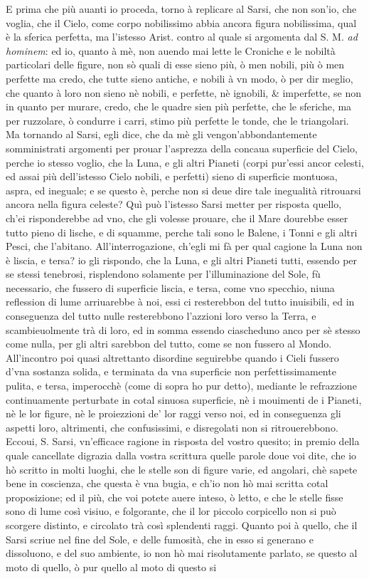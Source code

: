 \documentclass[11pt,twoside,openany]{book}
\begin{document}
E prima che più auanti io proceda, torno à replicare al Sarsi, che non son'io, che voglia, che il Cielo, come corpo nobilissimo abbia ancora figura nobilissima, qual è la sferica perfetta, ma l'istesso Arist. contro al quale si argomenta dal S. M. \textit{ad hominem}: ed io, quanto à mè, non auendo mai lette le Croniche e le nobiltà particolari delle figure, non sò quali di esse sieno più, ò men nobili, più ò men perfette ma credo, che tutte sieno antiche, e nobili à vn modo, ò per dir meglio, che quanto à loro non sieno nè nobili, e perfette, nè ignobili, \& imperfette, se non in quanto per murare, credo, che le quadre sien più perfette, che le sferiche, ma per ruzzolare, ò condurre i carri, stimo più perfette le tonde, che le triangolari. Ma tornando al Sarsi, egli dice, che da mè gli vengon'abbondantemente somministrati argomenti per prouar l'asprezza della concaua superficie del Cielo, perche io stesso voglio, che la Luna, e gli altri Pianeti (corpi pur'essi ancor celesti, ed assai più dell'istesso Cielo nobili, e perfetti) sieno di superficie montuosa, aspra, ed ineguale; e se questo è, perche non si deue dire tale inegualità ritrouarsi ancora nella figura celeste? Quì può l'istesso Sarsi metter per risposta quello, ch'ei risponderebbe ad vno, che gli volesse prouare, che il Mare dourebbe esser tutto pieno di lische, e di squamme, perche tali sono le Balene, i Tonni e gli altri Pesci, che l'abitano. All'interrogazione, ch'egli mi fà per qual cagione la Luna non è liscia, e tersa? io gli rispondo, che la Luna, e gli altri Pianeti tutti, essendo per se stessi tenebrosi, risplendono solamente per l'illuminazione del Sole, fù necessario, che fussero di superficie liscia, e tersa, come vno specchio, niuna reflession di lume arriuarebbe à noi, essi ci resterebbon del tutto inuisibili, ed in conseguenza del tutto nulle resterebbono l'azzioni loro verso la Terra, e scambieuolmente trà di loro, ed in somma essendo ciascheduno anco per sè stesso come nulla, per gli altri sarebbon del tutto, come se non fussero al Mondo. All'incontro poi quasi altrettanto disordine seguirebbe quando i Cieli fussero d'vna sostanza solida, e terminata da vna superficie non perfettissimamente pulita, e tersa, imperocchè (come di sopra ho pur detto), mediante le refrazzione continuamente perturbate in cotal sinuosa superficie, nè i mouimenti de i Pianeti, nè le lor figure, nè le proiezzioni de' lor raggi verso noi, ed in conseguenza gli aspetti loro, altrimenti, che confusissimi, e disregolati non si ritrouerebbono. Eccoui, S. Sarsi, vn'efficace ragione in risposta del vostro quesito; in premio della quale cancellate digrazia dalla vostra scrittura quelle parole doue voi dite, che io hò scritto in molti luoghi, che le stelle son di figure varie, ed angolari, chè sapete bene in coscienza, che questa è vna bugia, e ch'io non hò mai scritta cotal proposizione; ed il più, che voi potete auere inteso, ò letto, e che le stelle fisse sono di lume così visiuo, e folgorante, che il lor piccolo corpicello non si può scorgere distinto, e circolato trà così splendenti raggi. Quanto poi à quello, che il Sarsi scriue nel fine del Sole, e delle fumosità, che in esso si generano e dissoluono, e del suo ambiente, io non hò mai risolutamente parlato, se questo al moto di quello, ò pur quello al moto di questo si 
\end{document}
